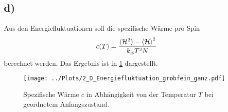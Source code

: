 \newpage

\subsection*{d)}
Aus den Energiefluktuationen soll die spezifische Wärme pro Spin \[c(T)=\frac{\braket{\mathcal{H}^2}-\braket{\mathcal{H}}^2}{k_\text{B}T^2N}\] berechnet werden.
Das Ergebnis ist in \cref{fig:spez} dargestellt.

\begin{figure}[H]
\centering
\texttt{[image: ../Plots/2\_D\_Energiefluktuation\_grobfein\_ganz.pdf]}
\caption{Spezifische Wärme $c$ in Abhängigkeit von der Temperatur $T$ bei geordnetem Anfangszustand.}
\label{fig:spez}
\end{figure}
